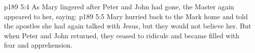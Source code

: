 \vs p189 5:4 As Mary lingered after Peter and John had gone, the Master again appeared to her, saying: 
\vs p189 5:5 Mary hurried back to the Mark home and told the apostles she had again talked with Jesus, but they would not believe her. But when Peter and John returned, they ceased to ridicule and became filled with fear and apprehension.
\quizlink
